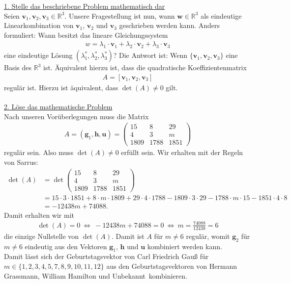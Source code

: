 \underline{1. Stelle das beschriebene Problem mathematisch dar}\\
Seien $ \textbf{v}_1, \textbf{v}_2, \textbf{v}_3  \in \mathbb{R}^3$. Unsere Fragestellung ist nun, wann $ \textbf{w} \in \mathbb{R}^3 $ als eindeutige Linearkombination von $ \textbf{v}_1 $, $ \textbf{v}_2 $ und $ \textbf{v}_3 $ geschrieben werden kann. Anders formuliert: Wann besitzt das lineare Gleichungssystem
\begin{align*}
w = \lambda_1 \cdot \textbf{v}_1 + \lambda_2 \cdot \textbf{v}_2 + \lambda_3 \cdot \textbf{v}_3
\end{align*}
eine eindeutige Lösung $ (\lambda_1^\ast,\lambda_2^\ast , \lambda_3^\ast) $?
Die Antwort ist: Wenn $ \{ \textbf{v}_1 , \textbf{v}_2, \textbf{v}_3 \} $ eine Basis des $ \mathbb{R}^3 $ ist. Äquivalent hierzu ist, dass die quadratische Koeffizientenmatrix
\begin{align*}
A = [\textbf{v}_1, \textbf{v}_2, \textbf{v}_3] 
\end{align*}
regulär ist. Hierzu ist äquivalent, dass $ \det(A) \neq 0 $ gilt.\\
\\
\newpage
\underline{2. Löse das mathematische Problem}\\
Nach unseren Vorüberlegungen muss die Matrix
\begin{align*}
A = (\textbf{g}_1, \textbf{h}, \textbf{u} ) =
\begin{pmatrix}
15 & 8 & 29\\
4 & 3  & m\\
1809 & 1788 & 1851
\end{pmatrix}
\end{align*}
regulär sein. Also muss $ \det(A) \neq 0  $ erfüllt sein.
Wir erhalten mit der Regeln von Sarrus:
\begin{align*}
\det(A)
&= 
\det
\begin{pmatrix}
15 & 8 & 29\\
4 & 3  & m\\
1809 & 1788 & 1851
\end{pmatrix}\\
&= 
15 \cdot 3 \cdot 1851 + 8 \cdot m \cdot 1809 + 29 \cdot 4 \cdot 1788
- 
 1809 \cdot 3 \cdot 29
-
1788 \cdot m \cdot 15 
-
1851 \cdot 4 \cdot 8 \\
&= 
-12438 m + 74088.
\end{align*}
Damit erhalten wir mit
\begin{align*}
\det(A) = 0 
\ \Leftrightarrow \
-12438 m + 74088 = 0
\ \Leftrightarrow \
m = \frac{74088}{12438} = 6
\end{align*}
die einzige Nullstelle von $ \det(A) $.
Damit ist $ A  $ für $ m\neq 6 $ regulär, womit $ \textbf{g}_2 $ für $ m \neq 6 $ eindeutig aus den Vektoren $ \textbf{g}_1 $, $ \textbf{h} $ und $ \textbf{u} $ kombiniert werden kann.\\
Damit lässt sich der Geburtstagsvektor von Carl Friedrich Gauß für $ m \in \{ 1,2 ,3,4,5,7,8,9,10,11,12\} $ aus den Geburtstagsvektoren von Hermann Grassmann, William Hamilton und \glqq Unbekannt\grqq \ kombinieren.

